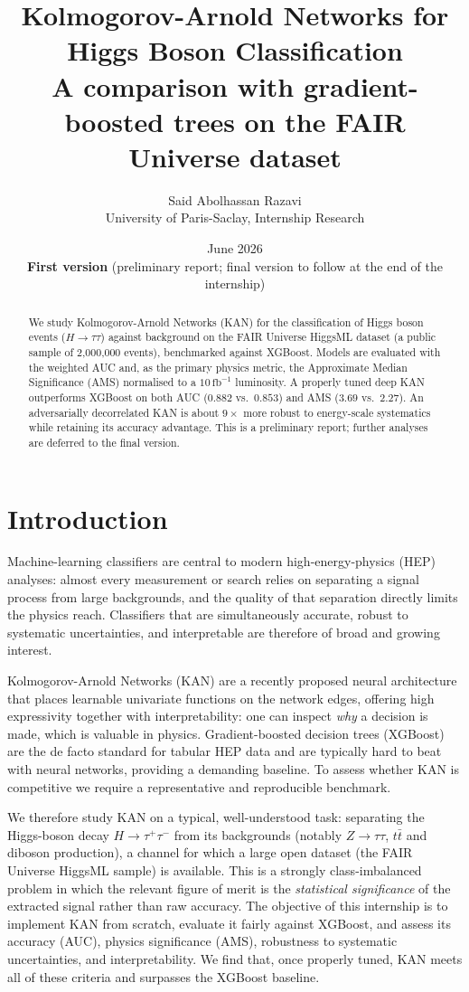 \documentclass[11pt]{article}
\title{\textbf{Kolmogorov-Arnold Networks for Higgs Boson Classification}\\
\large A comparison with gradient-boosted trees on the FAIR Universe dataset}
\author{Said Abolhassan Razavi\\
\small University of Paris-Saclay, Internship Research}
\date{June 2026 \\[2pt] \small \textbf{First version} (preliminary report; final version to follow at the end of the internship)}
\begin{document}
\maketitle

\begin{abstract}
\noindent We study Kolmogorov-Arnold Networks (KAN) for the classification of Higgs boson
events ($H\rightarrow\tau\tau$) against background on the FAIR Universe HiggsML dataset
(a public sample of 2{,}000{,}000 events), benchmarked against XGBoost. Models are evaluated
with the weighted AUC and, as the primary physics metric, the Approximate Median Significance
(AMS) normalised to a $10\,\mathrm{fb}^{-1}$ luminosity. A properly tuned deep KAN
outperforms XGBoost on both AUC ($0.882$ vs.\ $0.853$) and AMS ($3.69$ vs.\ $2.27$).
An adversarially decorrelated KAN is about $9\times$ more robust to energy-scale
systematics while retaining its accuracy advantage. This is a preliminary report; further
analyses are deferred to the final version.
\end{abstract}

\section{Introduction}
Machine-learning classifiers are central to modern high-energy-physics (HEP) analyses: almost
every measurement or search relies on separating a signal process from large backgrounds, and
the quality of that separation directly limits the physics reach. Classifiers that are
simultaneously accurate, robust to systematic uncertainties, and interpretable are therefore of
broad and growing interest.

Kolmogorov-Arnold Networks (KAN) are a recently proposed neural architecture that places
learnable univariate functions on the network edges, offering high expressivity together with
interpretability: one can inspect \emph{why} a decision is made, which is valuable in
physics. Gradient-boosted decision trees (XGBoost) are the de facto standard for tabular HEP
data and are typically hard to beat with neural networks, providing a demanding baseline. To
assess whether KAN is competitive we require a representative and reproducible benchmark.

We therefore study KAN on a typical, well-understood task: separating the Higgs-boson decay
$H\rightarrow\tau^+\tau^-$ from its backgrounds (notably $Z\rightarrow\tau\tau$, $t\bar t$ and
diboson production), a channel for which a large open dataset (the FAIR Universe HiggsML
sample) is available. This is a strongly class-imbalanced problem in which the relevant
figure of merit is the \emph{statistical significance} of the extracted signal rather than raw
accuracy. The objective of this internship is to implement KAN from scratch, evaluate it fairly
against XGBoost, and assess its accuracy (AUC), physics significance (AMS), robustness to
systematic uncertainties, and interpretability. We find that, once properly tuned, KAN meets
all of these criteria and surpasses the XGBoost baseline.
\end{document}
